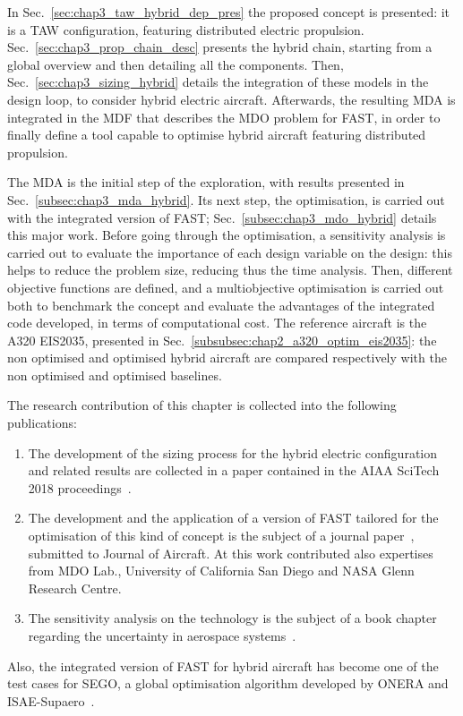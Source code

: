 In Sec.~\ref{sec:chap3_taw_hybrid_dep_pres} the proposed concept is presented: it is a TAW configuration, featuring distributed electric propulsion.
Sec.~\ref{sec:chap3_prop_chain_desc} presents the hybrid chain, starting from a global overview and then detailing all the components.
Then, Sec.~\ref{sec:chap3_sizing_hybrid} details the integration of these models in the design loop, to consider hybrid electric aircraft. 
Afterwards, the resulting MDA is integrated in the MDF that describes the MDO problem for FAST, in order to finally define a tool capable to optimise hybrid aircraft featuring distributed propulsion.

The MDA is the initial step of the exploration, with results presented in Sec.~\ref{subsec:chap3_mda_hybrid}. 
Its next step, the optimisation, is carried out with the integrated version of FAST; Sec.~\ref{subsec:chap3_mdo_hybrid} details this major work.  
Before going through the optimisation, a sensitivity analysis is carried out to evaluate the importance of each design variable on the design: this helps to reduce the problem size, reducing thus the time analysis. 
Then, different objective functions are defined, and a multiobjective optimisation is carried out both to benchmark the concept and evaluate the advantages of the integrated code developed, in terms of computational cost.  
The reference aircraft is the A320 EIS2035, presented in Sec.~\ref{subsubsec:chap2_a320_optim_eis2035}: the non optimised and optimised hybrid aircraft are compared respectively with the non optimised and optimised baselines. 

The research contribution of this chapter is collected into the following publications: 
\begin{enumerate}
	\item The development of the sizing process for the hybrid electric configuration and related results are collected in a paper contained in the AIAA SciTech 2018 proceedings~\cite{bib:sgueglia}.
	
	\item The development and the application of a version of FAST tailored for the optimisation of this kind of concept is the subject of a journal paper~\cite{bib:sgueglia_joa}, submitted to Journal of Aircraft.
	At this work contributed also expertises from MDO Lab., University of California San Diego and NASA Glenn Research Centre. 
	
	\item The sensitivity analysis on the technology is the subject of a book chapter regarding the uncertainty in aerospace systems~\cite{bib:sgueglia_book}.
\end{enumerate}
Also, the integrated version of FAST for hybrid aircraft has become one of the test cases for SEGO, a global optimisation algorithm developed by ONERA and ISAE-Supaero~\cite{bib:bartoli_sego}. 

